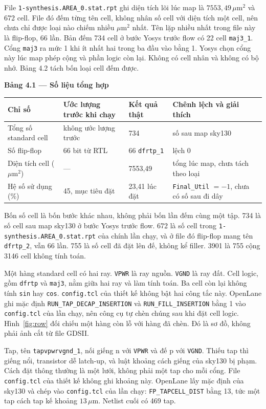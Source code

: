 \documentclass[12pt,a4paper]{article}
\begin{document}
File \texttt{1-synthesis.AREA\_0.stat.rpt} ghi diện tích lõi lúc map là \(7553{,}49\,\mu\mathrm{m}^{2}\) và 672 cell. File đó đếm từng tên cell, không nhân số cell với diện tích một cell, nên chưa chỉ được loại nào chiếm nhiều \(\mu\mathrm{m}^{2}\) nhất. Tên lặp nhiều nhất trong file này là flip-flop, 66 lần. Bản đếm 734 cell ở bước Yosys trước flow có 22 cell \texttt{maj3\_1}. Cổng \texttt{maj3} ra mức 1 khi ít nhất hai trong ba đầu vào bằng 1. Yosys chọn cổng này lúc map phép cộng và phần logic còn lại. Không có cell nhân và không có bộ nhớ. Bảng 4.2 tách bốn loại cell đếm được.

\noindent\textbf{Bảng 4.1 — Số liệu tổng hợp}

\begin{tabularx}{\textwidth}{|Y|Y|Y|Y|}
\hline
Chỉ số & Ước lượng trước khi chạy & Kết quả thật & Chênh lệch và giải thích \\ \hline
Tổng số standard cell & không ước lượng trước & 734 & số sau map sky130 \\ \hline
Số flip-flop & 66 bit từ RTL & 66 \texttt{dfrtp\_1} & lệch 0 \\ \hline
Diện tích cell ($\mu$m$^{2}$) & — & 7553{,}49 & tổng lúc map, chưa tách theo loại \\ \hline
Hệ số sử dụng (\%) & 45, mục tiêu đặt & 23{,}41 lúc đặt & \texttt{Final\_Util} \(= -1\), chưa có số sau đi dây \\ \hline
\end{tabularx}

Bốn số cell là bốn bước khác nhau, không phải bốn lần đếm cùng một tập. 734 là số cell sau map sky130 ở bước Yosys trước flow. 672 là số cell trong \texttt{1-synthesis.AREA\_0.stat.rpt} của chính lần chạy, và ở file đó flip-flop mang tên \texttt{dfrtp\_2}, vẫn 66 lần. 755 là số cell đã đặt lên đế, không kể filler. 3901 là 755 cộng 3146 cell không tính toán.

Một hàng standard cell có hai ray. \texttt{VPWR} là ray nguồn. \texttt{VGND} là ray đất. Cell logic, gồm \texttt{dfrtp} và \texttt{maj3}, nằm giữa hai ray và làm tính toán. Ba cell còn lại không tính \texttt{sin} hay \texttt{cos}. \texttt{config.tcl} của thiết kế không bật hai công tắc này. OpenLane ghi mặc định \texttt{RUN\_TAP\_DECAP\_INSERTION} và \texttt{RUN\_FILL\_INSERTION} bằng 1 vào \texttt{config.tcl} của lần chạy, nên công cụ tự chèn chúng sau khi đặt cell logic. Hình~\ref{fig:row} đối chiếu một hàng còn lỗ với hàng đã chèn. Đó là sơ đồ, không phải ảnh cắt từ file GDSII.

Tap, tên \texttt{tapvpwrvgnd\_1}, nối giếng n với \texttt{VPWR} và đế p với \texttt{VGND}. Thiếu tap thì giếng nổi, transistor dễ latch-up, và luật khoảng cách giếng của sky130 bị phạm. Cách đặt thông thường là một lưới, không phải một tap cho mỗi cổng. File \texttt{config.tcl} của thiết kế không ghi khoảng này. OpenLane lấy mặc định của sky130 và chép vào \texttt{config.tcl} của lần chạy: \texttt{FP\_TAPCELL\_DIST} bằng 13, tức một tap cách tap kế khoảng \(13\,\mu\mathrm{m}\). Netlist cuối có 469 tap.
\end{document}
